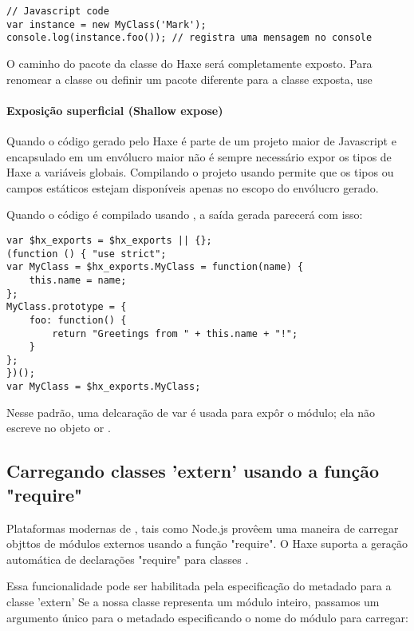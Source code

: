 \begin{lstlisting}
// Javascript code
var instance = new MyClass('Mark');
console.log(instance.foo()); // registra uma mensagem no console
\end{lstlisting}

O caminho do pacote da classe do Haxe será completamente exposto. Para renomear a classe ou definir um pacote diferente para a classe exposta, use 

\paragraph{Exposição superficial (Shallow expose)}

Quando o código gerado pelo Haxe é parte de um projeto maior de Javascript e encapsulado em um envólucro maior não é sempre necessário expor os tipos de Haxe a variáveis globais.
Compilando o projeto usando  permite que os tipos ou campos estáticos estejam disponíveis apenas no escopo do envólucro gerado.

Quando o código é compilado usando
 , a saída gerada parecerá com isso:

\begin{lstlisting}
var $hx_exports = $hx_exports || {};
(function () { "use strict";
var MyClass = $hx_exports.MyClass = function(name) {
	this.name = name;
};
MyClass.prototype = {
	foo: function() {
		return "Greetings from " + this.name + "!";
	}
};
})();
var MyClass = $hx_exports.MyClass;
\end{lstlisting}

Nesse padrão, uma delcaração de var é usada para expôr o módulo; ela não escreve no objeto 
  or . 

\subsection{Carregando classes 'extern' usando a função "require"}
\label{target-javascript-require}

Plataformas modernas de , tais como Node.js provêem uma maneira de carregar
objttos de módulos externos usando a função "require". O Haxe suporta a geração automática de 
declarações "require" para classes .

Essa funcionalidade pode ser habilitada  pela especificação do metadado  para a classe 'extern'
Se a nossa classe  representa um módulo inteiro, passamos um argumento único para o metadado  especificando o nome do módulo para carregar:

